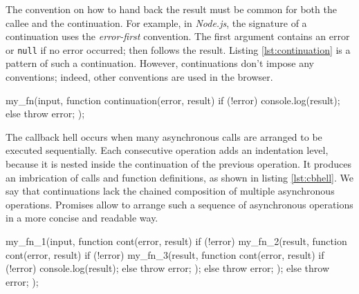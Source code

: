 The convention on how to hand back the result must be common for both the callee and the continuation.
For example, in \textit{Node.js}, the signature of a continuation uses the \textit{error-first} convention.
The first argument contains an error or \texttt{null} if no error occurred; then follows the result.
Listing \ref{lst:continuation} is a pattern of such a continuation.
However, continuations don't impose any conventions; indeed, other conventions are used in the browser.

\begin{code}[js, %
             caption={Example of a continuation}, %
             label={lst:continuation}] %
my_fn(input, function continuation(error, result) {
  if (!error) {
    console.log(result);
  } else {
    throw error;
  }
});
\end{code}

The callback hell occurs when many asynchronous calls are arranged to be executed sequentially.
Each consecutive operation adds an indentation level, because it is nested inside the continuation of the previous operation.
It produces an imbrication of calls and function definitions, as shown in listing \ref{lst:cbhell}.
We say that continuations lack the chained composition of multiple asynchronous operations.
Promises allow to arrange such a sequence of asynchronous operations in a more concise and readable way.


\begin{code}[js, %
             caption={Example of a sequence of continuations}, %
             label={lst:cbhell}] %
my_fn_1(input, function cont(error, result) {
  if (!error) {
    my_fn_2(result, function cont(error, result) {
      if (!error) {
        my_fn_3(result, function cont(error, result) {
          if (!error) {
            console.log(result);
          } else {
            throw error;
          }
        });
      } else {
        throw error;
      }
    });
  } else {
    throw error;
  }
});
\end{code}

